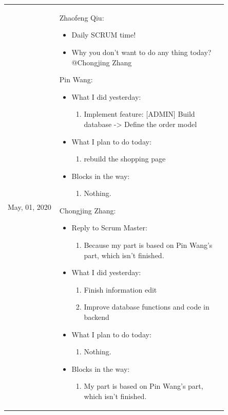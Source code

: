 \documentclass{report}
\begin{document}
\begin{tabularx}{0.95\linewidth}{%
  >{\raggedright\arraybackslash}p{0.2\linewidth}%
  >{\raggedright\arraybackslash}p{0.65\linewidth}}
  \\
  \midrule
  May, 01, 2020
  & 
  Zhaofeng Qiu:
  \begin{itemize}
    \item Daily SCRUM time! 
    \item Why you don't want to do any thing today? @Chongjing Zhang
  \end{itemize}
  Pin Wang:
  \begin{itemize}
    \item What I did yesterday: 
    \begin{enumerate}
      \item Implement feature: [ADMIN] Build database -> Define the order model
    \end{enumerate}
    \item What I plan to do today: 
    \begin{enumerate}
      \item rebuild the shopping page
    \end{enumerate}
    \item Blocks in the way: 
    \begin{enumerate}
      \item Nothing.
    \end{enumerate}
  \end{itemize}
  Chongjing Zhang:
  \begin{itemize}
    \item Reply to Scrum Master:
    \begin{enumerate}
      \item Because my part is based on Pin Wang's part, which isn't finished.
    \end{enumerate}
    \item What I did yesterday: 
    \begin{enumerate}
      \item Finish information edit 
      \item Improve database functions and code in backend
    \end{enumerate}
    \item What I plan to do today:
      \begin{enumerate}
        \item Nothing.
      \end{enumerate}
    \item Blocks in the way: 
      \begin{enumerate}
        \item My part is based on Pin Wang's part, which isn't finished.

\end{enumerate}
\end{itemize}
\end{tabularx}
\end{document}
